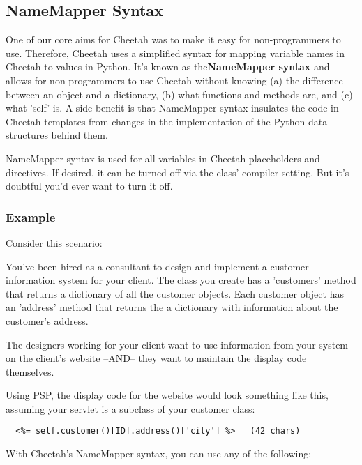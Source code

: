 \subsection{NameMapper Syntax}
\label{language.namemapper}

One of our core aims for Cheetah was to make it easy for non-programmers to
use. Therefore, Cheetah uses a simplified syntax for mapping variable
names in Cheetah to values in Python. It's known as the{\bf NameMapper syntax}
and allows for non-programmers to use Cheetah without knowing (a)
the difference between an object and a dictionary, (b) what functions
and methods are, and (c) what 'self' is. A side benefit is that NameMapper
syntax insulates the code in Cheetah templates from changes in the implementation
of the Python data structures behind them.

NameMapper syntax is used for all variables in Cheetah placeholders and
directives. If desired, it can be turned off via the  class'
 compiler setting.  But it's doubtful you'd ever want to
turn it off.

\subsubsection{Example}
\label{language.namemapper.example}

Consider this scenario:

You've been hired as a consultant to design and implement a customer information
system for your client. The class you create has a 'customers' method that
returns a dictionary of all the customer objects.  Each customer object has an
'address' method that returns the a dictionary with information about the
customer's address.

The designers working for your client want to use information from your system
on the client's website --AND-- they want to maintain the display code
themselves.

Using PSP, the display code for the website would look something like this,
assuming your servlet is a subclass of your customer class:


\begin{verbatim}
  <%= self.customer()[ID].address()['city'] %>   (42 chars)
\end{verbatim}

With Cheetah's NameMapper syntax, you can use any of the following:

